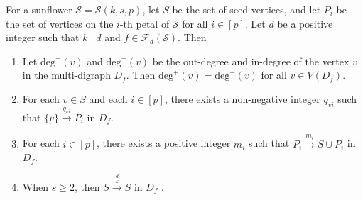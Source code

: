 \documentclass[10pt,a4paper]{amsart}
\begin{document}
\begin{lem}\label{yinli3.2}
For a sunflower $\mathcal{S}=\mathcal{S}(k,s,p)$,
let $S$ be the set of seed vertices, and let $P_{i}$ be the set of vertices on the $i$-th petal of $\mathcal{S}$ for all $i\in[p]$.
Let $d$ be a positive integer such that $k \mid d$ and $f \in \mathcal{F}_d(\mathcal{S})$.
Then

\begin{enumerate}
\renewcommand{\labelenumi}{(\alph{enumi})}
\item Let $\mathrm{deg}^+(v)$ and $\mathrm{deg}^-(v)$ be the out-degree and in-degree of the vertex $v$ in the multi-digraph $D_f$. Then $\mathrm{deg}^+(v) =\mathrm{deg}^-(v)$  for all $v \in V(D_f)$.

\item  For each $v \in S$ and each $i \in [p]$,  there exists a non-negative integer $q_{vi}$ such that $\{v\} \xrightarrow{q_{vi}}  P_{i}$ in $D_f$.

\item For each $i \in [p]$,  there exists a positive integer $m_i$ such that $P_{i} \xrightarrow{m_i} S \cup P_{i}$ in $D_f$.

\item When $s \geq 2$, then $S \xrightarrow{\frac{d}{k}} S$ in $D_f$ .


\end{enumerate}
\end{lem}
\end{document}
